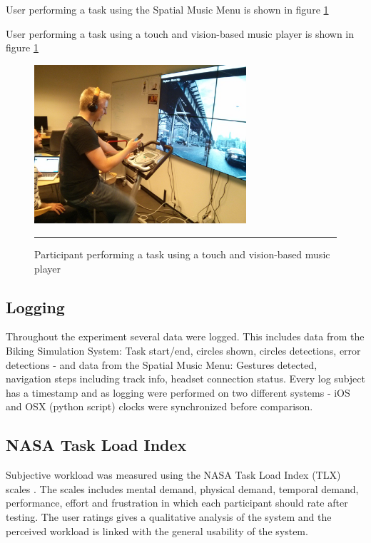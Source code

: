 User performing a task using the Spatial Music Menu is shown in figure \ref{fig:evalspatial}

User performing a task using a touch and vision-based music player is shown in figure \ref{fig:evalspatial}

\begin{figure}[t]
	\centering
		\includegraphics[width=0.7\textwidth,height=\textheight,keepaspectratio]{./Figures/evaluation_normal.jpg}
		\rule{35em}{1pt}
	\caption[Evaluation touch and vision-based interface]{Participant performing a task using a touch and vision-based music player}
	\label{fig:evalspatial}
\end{figure}

\subsection{Logging}
Throughout the experiment several data were logged. This includes data from the Biking Simulation System: Task start/end, circles shown, circles detections, error detections - and data from the Spatial Music Menu: Gestures detected, navigation steps including track info, headset connection status. Every log subject has a timestamp and as logging were performed on two different systems - iOS and OSX (python script) clocks were synchronized before comparison.


\subsection{NASA Task Load Index}
Subjective workload was measured using the NASA Task Load Index (TLX) scales \cite{hart_workload_1990}. The scales includes mental demand, physical demand, temporal demand, performance, effort and frustration in which each participant should rate after testing. The user ratings gives a qualitative analysis of the system and the perceived workload is linked with the general usability of the system.

